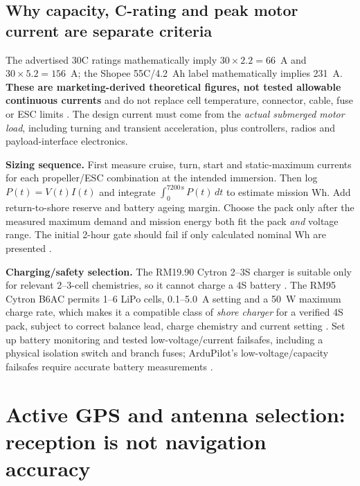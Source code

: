 \subsection{Why capacity, C-rating and peak motor current are separate criteria}
The advertised 30C ratings mathematically imply $30\times2.2=66$~A and $30\times5.2=156$~A; the Shopee 55C/4.2~Ah label mathematically implies 231~A. \textbf{These are marketing-derived theoretical figures, not tested allowable continuous currents} and do not replace cell temperature, connector, cable, fuse or ESC limits \cite{bat22,bat52,bat4Shopee}. The design current must come from the \emph{actual submerged motor load}, including turning and transient acceleration, plus controllers, radios and payload-interface electronics.\par
\textbf{Sizing sequence.} First measure cruise, turn, start and static-maximum currents for each propeller/ESC combination at the intended immersion. Then log $P(t)=V(t)I(t)$ and integrate $\int_0^{7200\,\mathrm{s}}P(t)\,dt$ to estimate mission Wh. Add return-to-shore reserve and battery ageing margin. Choose the pack only after the measured maximum demand and mission energy both fit the pack \emph{and} voltage range. The initial 2-hour gate should fail if only calculated nominal Wh are presented \cite{project,failsafes}.\par
\textbf{Charging/safety selection.} The RM19.90 Cytron 2--3S charger is suitable only for relevant 2--3-cell chemistries, so it cannot charge a 4S battery \cite{charger}. The RM95 Cytron B6AC permits 1--6 LiPo cells, 0.1--5.0~A setting and a 50~W maximum charge rate, which makes it a compatible class of \emph{shore charger} for a verified 4S pack, subject to correct balance lead, charge chemistry and current setting \cite{charger4}. Set up battery monitoring and tested low-voltage/current failsafes, including a physical isolation switch and branch fuses; ArduPilot's low-voltage/capacity failsafes require accurate battery measurements \cite{coreDoc,failsafes,kill,fuse}.

\section{Active GPS and antenna selection: reception is not navigation accuracy}
\label{sec:gps}
